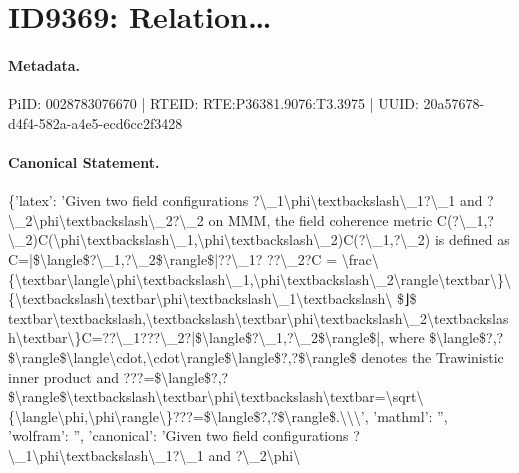 \section*{ID9369: Relation…}
\paragraph{Metadata.}
PiID: 0028783076670 | RTEID: RTE:P36381.9076:T3.3975 | UUID: 20a57678-d4f4-582a-a4e5-ecd6cc2f3428

\paragraph{Canonical Statement.}
\{'latex': 'Given two field configurations ?\textbackslash{}\_1\textbackslash{}phi\textbackslash{}textbackslash\textbackslash{}\_1?\textbackslash{}\_1 and ?\textbackslash{}\_2\textbackslash{}phi\textbackslash{}textbackslash\textbackslash{}\_2?\textbackslash{}\_2 on MMM, the field coherence metric C(?\textbackslash{}\_1,?\textbackslash{}\_2)C(\textbackslash{}phi\textbackslash{}textbackslash\textbackslash{}\_1,\textbackslash{}phi\textbackslash{}textbackslash\textbackslash{}\_2)C(?\textbackslash{}\_1,?\textbackslash{}\_2) is defined as C=|\$\textbackslash{}langle\$?\textbackslash{}\_1,?\textbackslash{}\_2\$\textbackslash{}rangle\$|??\textbackslash{}\_1? ??\textbackslash{}\_2?C = \textbackslash{}frac\textbackslash{}\{\textbackslash{}textbar\textbackslash{}langle\textbackslash{}phi\textbackslash{}textbackslash\textbackslash{}\_1,\textbackslash{}phi\textbackslash{}textbackslash\textbackslash{}\_2\textbackslash{}rangle\textbackslash{}textbar\textbackslash{}\}\textbackslash{}\{\textbackslash{}textbackslash\textbackslash{}textbar\textbackslash{}phi\textbackslash{}textbackslash\textbackslash{}\_1\textbackslash{}textbackslash\textbackslash{} \$⌋\$ textbar\textbackslash{}textbackslash,\textbackslash{}textbackslash\textbackslash{}textbar\textbackslash{}phi\textbackslash{}textbackslash\textbackslash{}\_2\textbackslash{}textbackslash\textbackslash{}textbar\textbackslash{}\}C=??\textbackslash{}\_1???\textbackslash{}\_2?|\$\textbackslash{}langle\$?\textbackslash{}\_1,?\textbackslash{}\_2\$\textbackslash{}rangle\$|, where \$\textbackslash{}langle\$?,?\$\textbackslash{}rangle\$\textbackslash{}langle\textbackslash{}cdot,\textbackslash{}cdot\textbackslash{}rangle\$\textbackslash{}langle\$?,?\$\textbackslash{}rangle\$ denotes the Trawinistic inner product and ???=\$\textbackslash{}langle\$?,?\$\textbackslash{}rangle\$\textbackslash{}textbackslash\textbackslash{}textbar\textbackslash{}phi\textbackslash{}textbackslash\textbackslash{}textbar=\textbackslash{}sqrt\textbackslash{}\{\textbackslash{}langle\textbackslash{}phi,\textbackslash{}phi\textbackslash{}rangle\textbackslash{}\}???=\$\textbackslash{}langle\$?,?\$\textbackslash{}rangle\$.\textbackslash{}\textbackslash{}\textbackslash{}', 'mathml': '', 'wolfram': '', 'canonical': 'Given two field configurations ?\textbackslash{}\_1\textbackslash{}phi\textbackslash{}textbackslash\textbackslash{}\_1?\textbackslash{}\_1 and ?\textbackslash{}\_2\textbackslash{}phi\textbackslash{}

